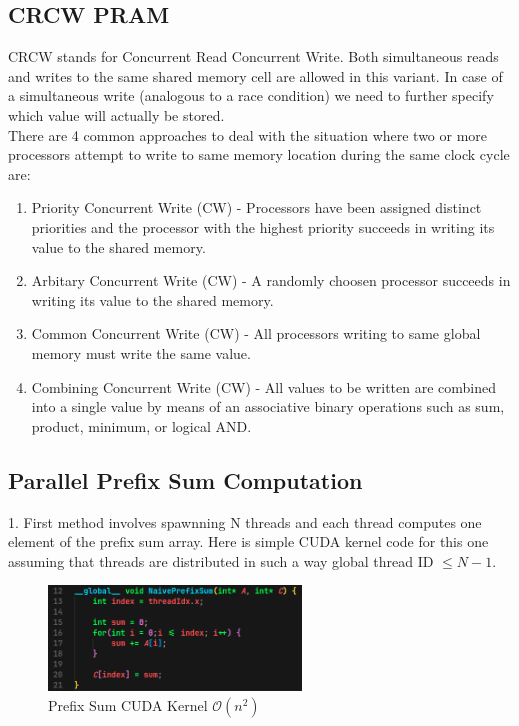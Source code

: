 \documentclass{article}
\begin{document}
\subsection*{CRCW PRAM}
CRCW stands for Concurrent Read Concurrent Write. Both simultaneous reads and writes to the same shared memory cell are allowed in this variant. In case of a simultaneous write (analogous to a race condition) we need to further specify which value will actually be stored. \\

There are 4 common approaches to deal with the situation where two or more processors attempt to write to same memory location during the same clock cycle are:
\begin{enumerate}
    \item Priority Concurrent Write (CW) - Processors have been assigned distinct priorities and the processor with the highest priority succeeds in writing its value to the shared memory.
    \item Arbitary Concurrent Write (CW) - A randomly choosen processor succeeds in writing its value to the shared memory.
    \item Common Concurrent Write (CW) - All processors writing to same global memory must write the same value.
    \item Combining Concurrent Write (CW) - All values to be written are combined into a single value by means of an associative binary operations such as sum, product, minimum, or logical AND.
\end{enumerate}

\subsection*{Parallel Prefix Sum Computation}
1. First method involves spawnning N threads and each thread computes one element of the prefix sum array. Here is simple CUDA kernel code for this one assuming that threads are distributed in such a way global thread ID $\leq N-1$.

\begin{figure}[h]
    \centering
    \includegraphics[width=0.6\textwidth]{Images/prefix1.png}
    \caption{Prefix Sum CUDA Kernel $\mathcal{O}(n^2)$}
\end{figure}
\end{document}
